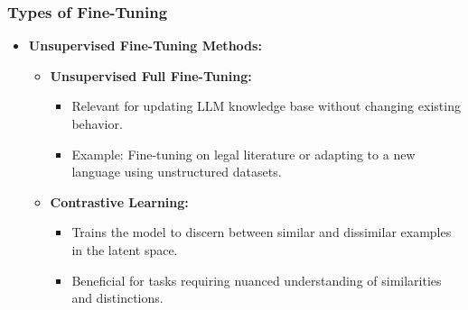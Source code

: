 \begin{frame}[fragile]\frametitle{Types of Fine-Tuning}
  \begin{itemize}
    \item \textbf{Unsupervised Fine-Tuning Methods:}
      \begin{itemize}
        \item \textbf{Unsupervised Full Fine-Tuning:}
          \begin{itemize}
            \item Relevant for updating LLM knowledge base without changing existing behavior.
            \item Example: Fine-tuning on legal literature or adapting to a new language using unstructured datasets.
          \end{itemize}
        \item \textbf{Contrastive Learning:}
          \begin{itemize}
            \item Trains the model to discern between similar and dissimilar examples in the latent space.
            \item Beneficial for tasks requiring nuanced understanding of similarities and distinctions.
          \end{itemize}
      \end{itemize}
  \end{itemize}
\end{frame}

